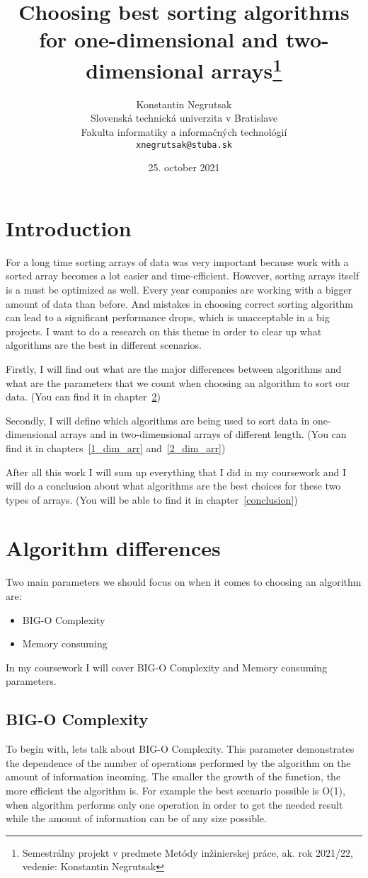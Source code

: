 \documentclass[12pt,twoside,a4paper]{article}
\title{Choosing best sorting algorithms for one-dimensional and two-dimensional arrays\thanks{Semestrálny projekt v predmete Metódy inžinierskej práce, ak. rok 2021/22, vedenie: Konstantin Negrutsak}}
\author{Konstantin Negrutsak\\[2pt]
	{\small Slovenská technická univerzita v Bratislave}\\
	{\small Fakulta informatiky a informačných technológií}\\
	{\small \texttt{xnegrutsak@stuba.sk}}
	}
\date{\small 25. october 2021}
\begin{document}
\maketitle


\section{Introduction}
For a long time sorting arrays of data was very important because work with a sorted array becomes a lot easier and time-efficient. However, sorting arrays itself is a must be optimized as well. Every year companies are working with a bigger amount of data than before. And mistakes in choosing correct sorting algorithm can lead to a significant performance drops, which is unacceptable in a big projects. I want to do a research on this theme in order to clear up what algorithms are the best in different scenarios.


Firstly, I will find out what are the major differences between algorithms and what are the parameters that we count when choosing an algorithm to sort our data.
(You can find it in chapter~\ref{alg_diff})

Secondly, I will define which algorithms are being used to sort data in one-dimensional arrays and in two-dimensional arrays of different length.
(You can find it in chapters~\ref{1_dim_arr} and~\ref{2_dim_arr})

After all this work I will sum up everything that I did in my coursework and I will do a conclusion about what algorithms are the best choices for these two types of arrays. (You will be able to find it in chapter~\ref{conclusion})

\section{Algorithm differences} \label{alg_diff}

Two main parameters we should focus on when it comes to choosing an algorithm are:
\begin{itemize}
\item BIG-O Complexity
\item Memory consuming
\end{itemize}
In my coursework I will cover BIG-O Complexity and Memory consuming parameters.
\subsection{BIG-O Complexity}
To begin with, lets talk about BIG-O Complexity. This parameter demonstrates the dependence of the number of operations performed by the algorithm on the amount of information incoming. The smaller the growth of the function, the more efficient the algorithm is.
For example the best scenario possible is O(1), when algorithm performs only one operation in order to get the needed result while the amount of information can be of any size possible.
\end{document}
